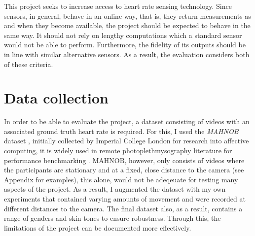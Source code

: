 This project seeks to increase access to heart rate sensing technology.
Since sensors, in general, behave in an online way, that is, they return measurements as and when they become available, the project should be expected to behave in the same way.
It should not rely on lengthy computations which a standard sensor would not be able to perform. 
Furthermore, the fidelity of its outputs should be in line with similar alternative sensors.
As a result, the evaluation considers both of these criteria.

\section{Data collection}
In order to be able to evaluate the project, a dataset consisting of videos with an associated ground truth heart rate is required.
For this, I used the \textit{MAHNOB} dataset \cite{Mahnob}, initially collected by Imperial College London for research into affective computing, it is widely used in remote photoplethmysography literature for performance benchmarking \cite{novel}\cite{mahnob-example}\cite{mahnob-example-2}.
MAHNOB, however, only consists of videos where the participants are stationary and at a fixed, close distance to the camera (see Appendix for examples), this alone, would not be adeqeuate for testing many aspects of the project.
As a result, I augmented the dataset with my own experiments that contained varying amounts of movement and were recorded at different distances to the camera. 
The final dataset also, as a result, contains a range of genders and skin tones to ensure robustness.
Through this, the limitations of the project can be documented more effectively.

